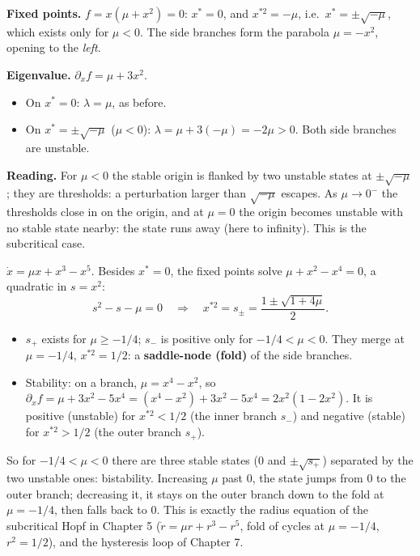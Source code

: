 \documentclass[11pt,openany]{report}
\begin{document}
\begin{worked}[(c) Subcritical pitchfork: $\dot x = \mu x + x^3$]
\textbf{Fixed points.} $f = x(\mu + x^2) = 0$: $x^* = 0$, and $x^{*2} = -\mu$, i.e.\ $x^* = \pm\sqrt{-\mu}$, which exists only
for $\mu<0$. The side branches form the parabola $\mu = -x^2$, opening to the \emph{left}.

\textbf{Eigenvalue.} $\partial_x f = \mu + 3x^2$.
\begin{itemize}
\item On $x^* = 0$: $\lambda = \mu$, as before.
\item On $x^* = \pm\sqrt{-\mu}$ ($\mu<0$): $\lambda = \mu + 3(-\mu) = -2\mu > 0$. Both side branches are unstable.
\end{itemize}
\textbf{Reading.} For $\mu<0$ the stable origin is flanked by two unstable states at $\pm\sqrt{-\mu}$; they are thresholds:
a perturbation larger than $\sqrt{-\mu}$ escapes. As $\mu\to0^-$ the thresholds close in on the origin, and at $\mu=0$ the
origin becomes unstable with no stable state nearby: the state runs away (here to infinity). This is the subcritical
case.
\end{worked}

\begin{worked}
$\dot x = \mu x + x^3 - x^5$. Besides $x^*=0$, the fixed points solve $\mu + x^2 - x^4 = 0$, a quadratic in $s = x^2$:
\[
s^2 - s - \mu = 0\quad\Rightarrow\quad x^{*2} = s_\pm = \frac{1\pm\sqrt{1+4\mu}}{2}.
\]
\begin{itemize}
\item $s_+$ exists for $\mu\ge-1/4$; $s_-$ is positive only for $-1/4<\mu<0$. They merge at $\mu = -1/4$, $x^{*2} = 1/2$:
a \textbf{saddle-node (fold)} of the side branches.
\item Stability: on a branch, $\mu = x^4 - x^2$, so
$\partial_x f = \mu + 3x^2 - 5x^4 = (x^4 - x^2) + 3x^2 - 5x^4 = 2x^2(1 - 2x^2)$.
It is positive (unstable) for $x^{*2}<1/2$ (the inner branch $s_-$) and negative (stable) for $x^{*2}>1/2$ (the outer
branch $s_+$).
\end{itemize}
So for $-1/4<\mu<0$ there are three stable states (0 and $\pm\sqrt{s_+}$) separated by the two unstable ones: bistability.
Increasing $\mu$ past 0, the state jumps from 0 to the outer branch; decreasing it, it stays on the outer branch down to
the fold at $\mu=-1/4$, then falls back to 0. This is exactly the radius equation of the subcritical Hopf in Chapter 5
($\dot r = \mu r + r^3 - r^5$, fold of cycles at $\mu=-1/4$, $r^2 = 1/2$), and the hysteresis loop of Chapter 7.
\end{worked}
\end{document}
